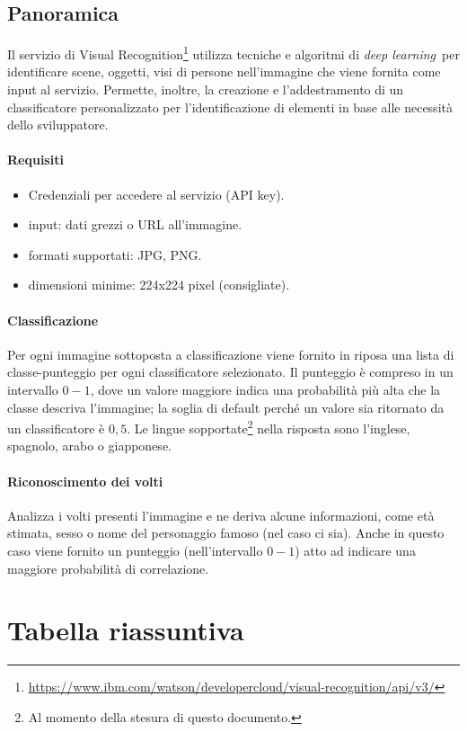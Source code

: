 \documentclass[fleqn,a4paper,11pt]{report}
\begin{document}
\subsection{Panoramica}
Il servizio di Visual Recognition\footnote{\url{https://www.ibm.com/watson/developercloud/visual-recognition/api/v3/}} utilizza tecniche e algoritmi di \textit{deep learning} per identificare scene, oggetti, visi di persone nell'immagine che viene fornita come input al servizio. Permette, inoltre, la creazione e l'addestramento di un classificatore personalizzato per l'identificazione di elementi in base alle necessità dello sviluppatore.

\paragraph{Requisiti}
\begin{itemize}
\item Credenziali per accedere al servizio (API key).
\item input: dati grezzi o URL all'immagine.
\item formati supportati: JPG, PNG.
\item dimensioni minime: 224x224 pixel (consigliate).
\end{itemize}

\paragraph{Classificazione} Per ogni immagine sottoposta a classificazione viene fornito in riposa una lista di classe-punteggio per ogni classificatore selezionato. Il punteggio è compreso in un intervallo $0-1$, dove un valore maggiore indica una probabilità più alta che la classe descriva l'immagine; la soglia di default perché un valore sia ritornato da un classificatore è $0,5$. Le lingue sopportate\footnote{Al momento della stesura di questo documento.} nella risposta sono l'inglese, spagnolo, arabo o giapponese.

\paragraph{Riconoscimento dei volti} Analizza i volti presenti l'immagine e ne deriva alcune informazioni, come età stimata, sesso o nome del personaggio famoso (nel caso ci sia). Anche in questo caso viene fornito un punteggio (nell'intervallo $0-1$) atto ad indicare una maggiore probabilità di correlazione.

\section{Tabella riassuntiva}
\end{document}
